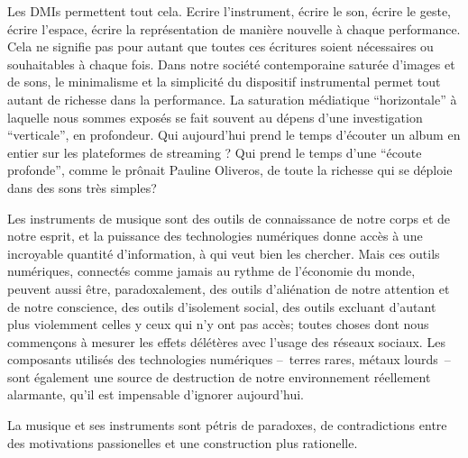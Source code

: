 Les \glspl{DMI} permettent tout cela. Ecrire l'instrument, écrire le son, écrire le geste, écrire l'espace, écrire la représentation de manière nouvelle à chaque performance. Cela ne signifie pas pour autant que toutes ces écritures soient nécessaires ou souhaitables à chaque fois. Dans notre société contemporaine saturée d'images et de sons, le minimalisme et la simplicité du dispositif instrumental permet tout autant de richesse dans la performance. La saturation médiatique ``horizontale'' à laquelle nous sommes exposés se fait souvent au dépens d'une investigation ``verticale'', en profondeur. 
Qui aujourd'hui prend le temps d'écouter un album en entier sur les plateformes de streaming ? Qui prend le temps d'une ``écoute profonde'', comme le prônait Pauline Oliveros, de toute la richesse qui se déploie dans des sons très simples?

Les instruments de musique sont des outils de connaissance de notre corps et de notre esprit, et la puissance des technologies numériques donne accès à une incroyable quantité d'information, à qui veut bien les chercher. Mais ces outils numériques, connectés comme jamais au rythme de l'économie du monde, peuvent aussi être, paradoxalement, des outils d'aliénation de notre attention et de notre conscience, des outils d'isolement social, des outils excluant d'autant plus violemment celles y ceux qui n'y ont pas accès; toutes choses dont nous commençons à mesurer les effets délétères avec l'usage des réseaux sociaux. Les composants utilisés des technologies numériques --~terres rares, métaux lourds~-- sont également une source de destruction de notre environnement réellement alarmante, qu'il est impensable d'ignorer aujourd'hui.



La musique et ses instruments sont pétris de paradoxes, de contradictions entre des motivations passionelles et une construction plus rationelle.


